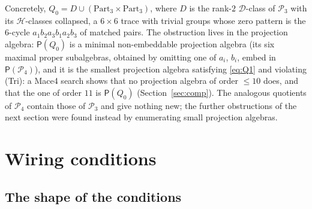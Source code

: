 \documentclass[11pt]{amsart}
\theoremstyle{definition}
\newcommand{\D}{\mathcal{D}}
\newcommand{\Hh}{\mathcal{H}}
\renewcommand{\P}{\mathcal{P}}      %
\newcommand{\PA}{\mathsf{P}}         %
\newcommand{\Part}{\mathrm{Part}}
\newcommand{\Tri}{\textup{(Tri)}}
\begin{document}
Concretely, $Q_0=D\cup(\Part_3\times\Part_3)$, where $D$ is the rank-$2$ $\D$-class of $\P_3$ with its $\Hh$-classes collapsed, a $6\times6$ trace with trivial groups whose zero pattern is the $6$-cycle $a_1b_2a_3b_1a_2b_3$ of matched pairs. The obstruction lives in the projection algebra: $\PA(Q_0)$ is a minimal non-embeddable projection algebra (its six maximal proper subalgebras, obtained by omitting one of $a_i$, $b_i$, embed in $\PA(\P_4)$), and it is the smallest projection algebra satisfying \eqref{eq:Q1} and violating \Tri: a Mace4 search shows that no projection algebra of order $\le10$ does, and that the one of order $11$ is $\PA(Q_0)$ (Section~\ref{sec:comp}). The analogous quotients of $\P_4$ contain those of $\P_3$ and give nothing new; the further obstructions of the next section were found instead by enumerating small projection algebras.

\section{Wiring conditions}\label{sec:wiring}

\subsection{The shape of the conditions}\label{subsec:shape}
\end{document}
